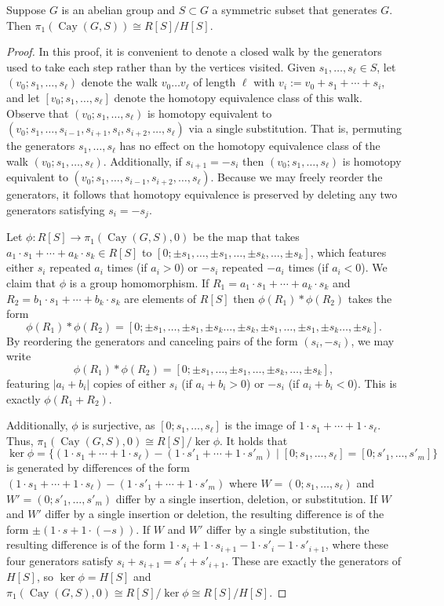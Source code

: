 \documentclass[10pt,a4paper]{amsart}
\DeclareMathOperator{\Cay}{Cay}
\begin{document}
\begin{proposition}\label{prop:pi1-for-abelian-Cayley-graph}
Suppose $G$ is an abelian group and $S\subset G$ a symmetric subset that generates $G$. Then $\pi_1(\Cay(G,S))\cong R[S]/H[S]$.
\end{proposition}

\begin{proof}
In this proof, it is convenient to denote a closed walk by the generators used to take each step rather than by the vertices visited. Given $s_1,\ldots,s_\ell\in S$, let $(v_0;s_1,\ldots, s_\ell)$ denote the walk $v_0\dots v_\ell$ of length $\ell$ with $v_i:=v_0+s_1+\cdots+s_i$, and let $[v_0;s_1,\ldots,s_\ell]$ denote the homotopy equivalence class of this walk. 
Observe that $(v_0;s_1,\dots, s_\ell)$ is homotopy equivalent to $(v_0;s_1,\dots,s_{i-1},s_{i+1},s_i,s_{i+2},\dots,s_\ell)$ via a single substitution. That is, permuting the generators $s_1,\ldots,s_\ell$ has no effect on the homotopy equivalence class of the walk $(v_0;s_1,\ldots,s_\ell)$.
Additionally, if $s_{i+1}=-s_i$ then $(v_0;s_1,\dots,s_\ell)$ is homotopy equivalent to $(v_0;s_1,\ldots,s_{i-1},s_{i+2},\dots,s_\ell)$. Because we may freely reorder the generators, it follows that homotopy equivalence is preserved by deleting any two generators satisfying $s_i=-s_j$.

Let $\phi:R[S]\to\pi_1(\Cay(G,S),0)$ be the map that takes $a_1\cdot s_1+\cdots+a_k\cdot s_k\in R[S]$ to $[0;\pm s_1,\ldots,\pm s_1,\ldots,\pm s_k,\ldots,\pm s_k]$, which features either $s_i$ repeated $a_i$ times (if $a_i>0$) or $-s_i$ repeated $-a_i$ times (if $a_i<0$). We claim that $\phi$ is a group homomorphism. If $R_1=a_1\cdot s_1+\cdots+a_k\cdot s_k$ and $R_2=b_1\cdot s_1+\cdots +b_k\cdot s_k$ are elements of $R[S]$ then $\phi(R_1)*\phi(R_2)$ takes the form
$$\phi(R_1)*\phi(R_2)=[0;\pm s_1,\ldots,\pm s_1,\pm s_k\ldots,\pm s_k,\pm s_1,\ldots,\pm s_1,\pm s_k\ldots,\pm s_k].$$
By reordering the generators and canceling pairs of the form $(s_i,-s_i)$, we may write
\[
\phi(R_1)*\phi(R_2)=[0;\pm s_1,\ldots,\pm s_1,\ldots,\pm s_k,\ldots,\pm s_k],
\]
featuring $|a_i+b_i|$ copies of either $s_i$ (if $a_i+b_i>0$) or $-s_i$ (if $a_i+b_i<0$). This is exactly $\phi(R_1+R_2)$.

Additionally, $\phi$ is surjective, as $[0;s_1,\ldots,s_\ell]$ is the image of $1\cdot s_1+\cdots+1\cdot s_\ell$. Thus, $\pi_1(\Cay(G,S),0)\cong R[S]/\ker\phi$. It holds that
\[
\ker\phi=\{(1\cdot s_1+\cdots+1\cdot s_\ell)-(1\cdot s'_1+\cdots+1\cdot s'_m) \mid [0;s_1,\ldots,s_\ell]=[0;s'_1,\ldots,s'_m]\}
\]
is generated by differences of the form $(1\cdot s_1+\cdots +1\cdot s_\ell)-(1\cdot s'_1+\cdots+1\cdot s'_m)$ where $W=(0;s_1,\ldots,s_\ell)$ and $W'=(0;s'_1,\ldots,s'_m)$ differ by a single insertion, deletion, or substitution. If $W$ and $W'$ differ by a single insertion or deletion, the resulting difference is of the form $\pm(1\cdot s+1\cdot (-s))$. If $W$ and $W'$ differ by a single substitution, the resulting difference is of the form $1\cdot s_i+1\cdot s_{i+1}-1\cdot s'_i-1\cdot s'_{i+1}$, where these four generators satisfy $s_i+s_{i+1}=s'_i+s'_{i+1}$.
These are exactly the generators of $H[S]$, so $\ker\phi=H[S]$ and $\pi_1(\Cay(G,S),0)\cong R[S]/\ker\phi\cong R[S]/H[S]$.
\end{proof}
\end{document}
